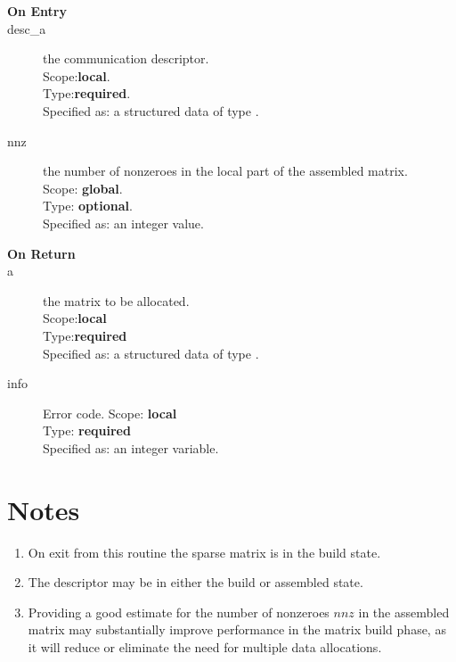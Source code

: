 


%
%


\begin{description}
\item[\bf On Entry]
\item[desc\_a] the communication descriptor.\\
Scope:{\bf local}.\\
Type:{\bf required}.\\
Specified as: a structured data of type \descdata.
\item[nnz] the number of nonzeroes in the local part of the assembled matrix.\\
Scope: {\bf global}.\\
Type: {\bf optional}.\\
Specified as: an integer value. 
\end{description}

\begin{description}
\item[\bf On Return]
\item[a] the matrix to be allocated.\\
Scope:{\bf local}\\
Type:{\bf required}\\
Specified as: a structured data of type \spdata.
\item[info] Error code.
Scope: {\bf local} \\
Type: {\bf required}\\
Specified as: an integer variable.
\end{description}
\section*{Notes}
\begin{enumerate}
\item On exit from this routine the sparse matrix  is in the build
  state.
\item The descriptor may be in either the build or assembled state.
\item Providing a good estimate for the number of nonzeroes $nnz$ in
  the assembled matrix may substantially improve performance in the
  matrix build phase, as it will reduce or eliminate the need for
  multiple data allocations. 
\end{enumerate}




